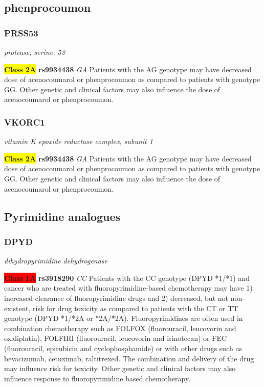 \documentclass{report}
\begin{document}
\subsection{ phenprocoumon }\subsubsection{ PRSS53 }
\textit{ protease, serine, 53 } \newline




\textbf{\colorbox{yellow} {Class 2A}} \textbf{ rs9934438 } \textit{ GA }
Patients with the AG genotype may have decreased dose of acenocoumarol or phenprocoumon as compared to patients with genotype GG. Other genetic and clinical factors may also influence the dose of acenocoumarol or phenprocoumon.\newline

\subsubsection{ VKORC1 }
\textit{ vitamin K epoxide reductase complex, subunit 1 } \newline




\textbf{\colorbox{yellow} {Class 2A}} \textbf{ rs9934438 } \textit{ GA }
Patients with the AG genotype may have decreased dose of acenocoumarol or phenprocoumon as compared to patients with genotype GG. Other genetic and clinical factors may also influence the dose of acenocoumarol or phenprocoumon.\newline



\subsection{ Pyrimidine analogues }\subsubsection{ DPYD }
\textit{ dihydropyrimidine dehydrogenase } \newline


\textbf{\colorbox{red} {Class 1A}} \textbf{ rs3918290 } \textit{ CC }
Patients with the CC genotype (DPYD *1/*1) and cancer who are treated with fluoropyrimidine-based chemotherapy may have 1) increased clearance of fluoropyrimidine drugs and 2) decreased, but not non-existent, risk for drug toxicity as compared to patients with the CT or TT genotype (DPYD *1/*2A or *2A/*2A). Fluoropyrimidines are often used in combination chemotherapy such as FOLFOX (fluorouracil, leucovorin and oxaliplatin), FOLFIRI (fluorouracil,  leucovorin and irinotecan) or FEC (fluorouracil, epirubicin and cyclophosphamide) or with other drugs such as bevacizumab, cetuximab, raltitrexed. The combination and delivery of the drug may influence risk for toxicity. Other genetic and clinical factors may also influence response to fluoropyrimidine based chemotherapy.\newline
\end{document}
